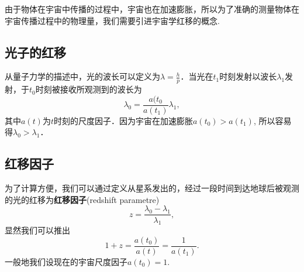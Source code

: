 
由于物体在宇宙中传播的过程中，宇宙也在加速膨胀，所以为了准确的测量物体在宇宙传播过程中的物理量，我们需要引进宇宙学红移的概念.

\subsection{光子的红移}
从量子力学的描述中，光的波长可以定义为$\lambda=\frac{h}{p}$．当光在$t_1$时刻发射以波长$\lambda_1$发射，于$t_0$时刻被接收所观测到的波长为
\begin{equation}
\lambda_0=\frac{a(t_0}{a(t_1)}\lambda_1,
\end{equation}
其中$a(t)$为$t$时刻的尺度因子．因为宇宙在加速膨胀$a(t_0)>a(t_1)$, 所以容易得$\lambda_0>\lambda_1$．

\subsection{红移因子}
为了计算方便，我们可以通过定义从星系发出的，经过一段时间到达地球后被观测的光的红移为\textbf{红移因子}(redshift parametre)
\begin{equation}
z=\frac{\lambda_0-\lambda_1}{\lambda_1},
\end{equation}
显然我们可以推出
\begin{equation}
1+z=\frac{a(t_0)}{a(t)}=\frac{1}{a(t_1)}.
\end{equation}
一般地我们设现在的宇宙尺度因子$a(t_0)=1$.